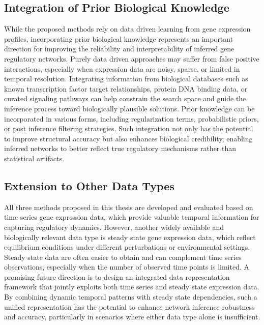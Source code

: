 \subsection{Integration of Prior Biological Knowledge}
While the proposed methods rely on data driven learning from gene expression profiles, incorporating prior biological knowledge represents an important direction for improving the reliability and interpretability of inferred gene regulatory networks. Purely data driven approaches may suffer from false positive interactions, especially when expression data are noisy, sparse, or limited in temporal resolution. Integrating information from biological databases such as known transcription factor target relationships, protein DNA binding data, or curated signaling pathways can help constrain the search space and guide the inference process toward biologically plausible solutions. Prior knowledge can be incorporated in various forms, including regularization terms, probabilistic priors, or post inference filtering strategies. Such integration not only has the potential to improve structural accuracy but also enhances biological credibility, enabling inferred networks to better reflect true regulatory mechanisms rather than statistical artifacts.
\subsection{Extension to Other Data Types}
All three methods proposed in this thesis are developed and evaluated based on time series gene expression data, which provide valuable temporal information for capturing regulatory dynamics. However, another widely available and biologically relevant data type is steady state gene expression data, which reflect equilibrium conditions under different perturbations or environmental settings. Steady state data are often easier to obtain and can complement time series observations, especially when the number of observed time points is limited. A promising future direction is to design an integrated data representation framework that jointly exploits both time series and steady state expression data. By combining dynamic temporal patterns with steady state dependencies, such a unified representation has the potential to enhance network inference robustness and accuracy, particularly in scenarios where either data type alone is insufficient.

